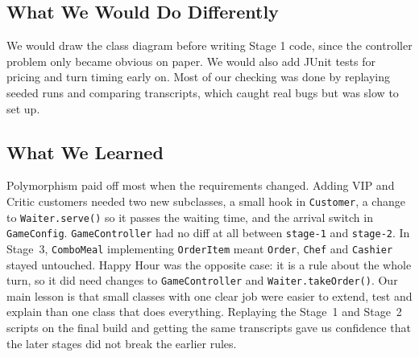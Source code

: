 \subsection{What We Would Do Differently}

We would draw the class diagram before writing Stage 1 code, since the controller problem only became obvious on paper. We would also add JUnit tests for pricing and turn timing early on. Most of our checking was done by replaying seeded runs and comparing transcripts, which caught real bugs but was slow to set up.

\subsection{What We Learned}

Polymorphism paid off most when the requirements changed. Adding VIP and Critic customers needed two new subclasses, a small hook in \texttt{Customer}, a change to \texttt{Waiter.serve()} so it passes the waiting time, and the arrival switch in \texttt{GameConfig}. \texttt{GameController} had no diff at all between \texttt{stage-1} and \texttt{stage-2}. In Stage~3, \texttt{ComboMeal} implementing \texttt{OrderItem} meant \texttt{Order}, \texttt{Chef} and \texttt{Cashier} stayed untouched. Happy Hour was the opposite case: it is a rule about the whole turn, so it did need changes to \texttt{GameController} and \texttt{Waiter.takeOrder()}. Our main lesson is that small classes with one clear job were easier to extend, test and explain than one class that does everything. Replaying the Stage~1 and Stage~2 scripts on the final build and getting the same transcripts gave us confidence that the later stages did not break the earlier rules.
